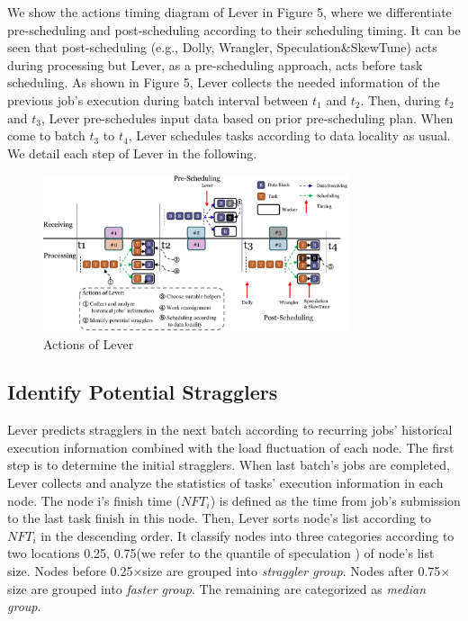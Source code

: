   We show the actions timing diagram of Lever in Figure 5, where we differentiate pre-scheduling and post-scheduling according to their scheduling timing. It can be seen that post-scheduling (e.g., Dolly, Wrangler, Speculation\&SkewTune) acts during processing but Lever, as a pre-scheduling approach, acts before task scheduling. As shown in Figure 5, Lever collects the needed information of the previous job's execution during batch interval between $t_1$ and $t_2$.
  Then, during $t_2$ and $t_3$, Lever pre-schedules input data based on prior pre-scheduling plan. When come to batch $t_3$ to $t_4$, Lever schedules tasks according to data locality as usual. We detail each step of Lever in the following.
  \begin{figure}[htbp]
    \centering
    \includegraphics[width=0.8\textwidth]{FigureAction}
    \caption{Actions of Lever}
    \label{Fig. 5:}
  \end{figure}

\subsection{Identify Potential Stragglers}

  Lever predicts stragglers in the next batch according to recurring jobs' historical execution information combined with the load fluctuation of each node. The first step is to determine the initial stragglers. When last batch's jobs are completed, Lever collects and analyze the statistics of tasks' execution information in each node. The node i's finish time ($NFT_i$) is defined as the time from job's submission to the last task finish in this node. Then, Lever sorts node's list according to $NFT_i$ in the descending order. It classify nodes into three categories according to two locations 0.25, 0.75(we refer to the quantile of speculation \cite{Dean2004}) of node's list size. Nodes before 0.25$\times$size are grouped into \emph{straggler group}. Nodes after 0.75$\times$size are grouped into \emph{faster group}. The remaining are categorized as \emph{median group}.

